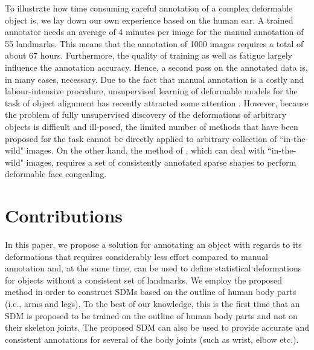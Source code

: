 To illustrate how time consuming careful annotation of a complex deformable object is, we lay down our own experience based on the human ear. A trained annotator needs an average of 4 minutes per image for the manual annotation of 55 landmarks. This means that the annotation of 1000 images requires a total of about 67 hours. Furthermore, the quality of training as well as fatigue largely influence the annotation accuracy. Hence, a second pass on the annotated data is, in many cases, necessary. Due to the fact that manual annotation is a costly and labour-intensive procedure, unsupervised learning of deformable models for the task of object alignment has recently attracted some attention \cite{frey2003learning, baker2004automatic, cootes2004groupwise, jojic2006escaping, Huang2006, kokkinos2007unsupervised, jiang2009learning, liu2009simultaneous, Zhang2012}. However, because the problem of fully unsupervised discovery of the deformations of arbitrary objects is difficult and ill-posed, the limited number of methods that have been proposed for the task cannot be directly applied to arbitrary collection of ``in-the-wild" images. On the other hand, the method of \cite{antonakos2014automatic}, which can deal with ``in-the-wild" images, requires a set of consistently annotated sparse shapes to perform deformable face congealing.


\section{Contributions}

In this paper, we propose a solution for annotating an object with regards to its deformations that requires considerably less effort compared to manual annotation and, at the same time, can be used to define statistical deformations for objects without a consistent set of landmarks. We employ the proposed method in order to construct SDMs based on the outline of human body parts (i.e., arms and legs). To the best of our knowledge, this is the first time that an SDM is proposed to be trained on the outline of human body parts and not on their skeleton joints. The proposed SDM can also be used to provide accurate and consistent annotations for several of the body joints (such as wrist, elbow etc.).

